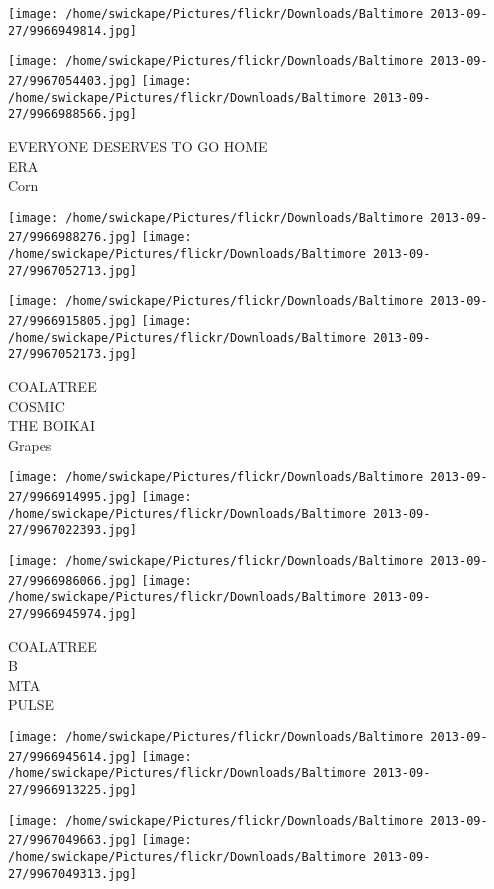 \documentclass[10pt,letterpaper]{article}
\begin{document}
\texttt{[image: /home/swickape/Pictures/flickr/Downloads/Baltimore 2013-09-27/9966949814.jpg]}

\vspace{0.25in}
\texttt{[image: /home/swickape/Pictures/flickr/Downloads/Baltimore 2013-09-27/9967054403.jpg]}
\texttt{[image: /home/swickape/Pictures/flickr/Downloads/Baltimore 2013-09-27/9966988566.jpg]}

EVERYONE DESERVES TO GO HOME\\
ERA\\
Corn\\
\pagebreak

\texttt{[image: /home/swickape/Pictures/flickr/Downloads/Baltimore 2013-09-27/9966988276.jpg]}
\texttt{[image: /home/swickape/Pictures/flickr/Downloads/Baltimore 2013-09-27/9967052713.jpg]}

\texttt{[image: /home/swickape/Pictures/flickr/Downloads/Baltimore 2013-09-27/9966915805.jpg]}
\texttt{[image: /home/swickape/Pictures/flickr/Downloads/Baltimore 2013-09-27/9967052173.jpg]}

COALATREE\\
COSMIC\\
THE BOIKAI\\
Grapes\\
\pagebreak

\texttt{[image: /home/swickape/Pictures/flickr/Downloads/Baltimore 2013-09-27/9966914995.jpg]}
\texttt{[image: /home/swickape/Pictures/flickr/Downloads/Baltimore 2013-09-27/9967022393.jpg]}

\texttt{[image: /home/swickape/Pictures/flickr/Downloads/Baltimore 2013-09-27/9966986066.jpg]}
\texttt{[image: /home/swickape/Pictures/flickr/Downloads/Baltimore 2013-09-27/9966945974.jpg]}

COALATREE\\
B\\
MTA\\
PULSE\\
\pagebreak

\texttt{[image: /home/swickape/Pictures/flickr/Downloads/Baltimore 2013-09-27/9966945614.jpg]}
\texttt{[image: /home/swickape/Pictures/flickr/Downloads/Baltimore 2013-09-27/9966913225.jpg]}

\texttt{[image: /home/swickape/Pictures/flickr/Downloads/Baltimore 2013-09-27/9967049663.jpg]}
\texttt{[image: /home/swickape/Pictures/flickr/Downloads/Baltimore 2013-09-27/9967049313.jpg]}
\end{document}
